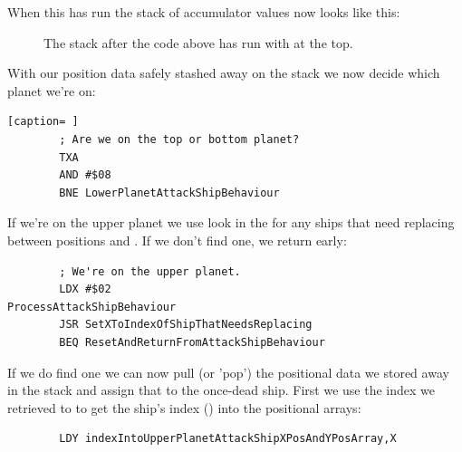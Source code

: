 When this has run the stack of accumulator values now looks like this:

\begin{figure}[H]
  {
    \setlength{\tabcolsep}{3.0pt}
    \setlength\cmidrulewidth{\heavyrulewidth} %
    \begin{adjustbox}{width=10cm,center}
    \end{adjustbox}

  }\caption{The stack after the code above has run with  at the top.}
\end{figure}

With our position data safely stashed away on the stack we now decide which planet we're on:

\begin{lstlisting}[caption= ]
        ; Are we on the top or bottom planet?
        TXA
        AND #$08
        BNE LowerPlanetAttackShipBehaviour
\end{lstlisting}

If we're on the upper planet we use  look in the  for any ships that
need replacing between positions  and . If we don't find one, we return early:

\begin{lstlisting}
        ; We're on the upper planet.
        LDX #$02
ProcessAttackShipBehaviour   
        JSR SetXToIndexOfShipThatNeedsReplacing
        BEQ ResetAndReturnFromAttackShipBehaviour
\end{lstlisting}

If we do find one we can now pull (or 'pop') the positional data we stored away in the stack and assign that to the once-dead
ship. First we use the index we retrieved to  to get the ship's index () into the positional arrays:

\begin{lstlisting}
        LDY indexIntoUpperPlanetAttackShipXPosAndYPosArray,X
\end{lstlisting}


